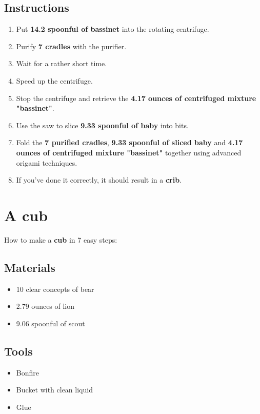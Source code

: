 \documentclass{article}
\begin{document}
\subsection{Instructions}\begin{enumerate}
\item 
Put \textbf{14.2 spoonful of bassinet} into the rotating centrifuge.
\item 
Purify \textbf{7 cradles} with the purifier.
\item 
Wait for a rather short time.
\item 
Speed up the centrifuge.
\item 
Stop the centrifuge and retrieve the \textbf{4.17 ounces of centrifuged mixture "bassinet"}.
\item 
Use the saw to slice \textbf{9.33 spoonful of baby} into bits.
\item 
Fold the \textbf{7 purified cradles}, \textbf{9.33 spoonful of sliced baby} and \textbf{4.17 ounces of centrifuged mixture "bassinet"} together using advanced origami techniques.
\item 
If you've done it correctly, it should result in a \textbf{crib}.
\end{enumerate}
\newpage
\section{A cub}How to make a \textbf{cub} in 7 easy steps:

\subsection{Materials}\begin{itemize}
\item 
10 clear concepts of bear
\item 
2.79 ounces of lion
\item 
9.06 spoonful of scout
\end{itemize}
\subsection{Tools}\begin{itemize}
\item 
Bonfire
\item 
Bucket with clean liquid
\item 
Glue
\end{itemize}
\end{document}
